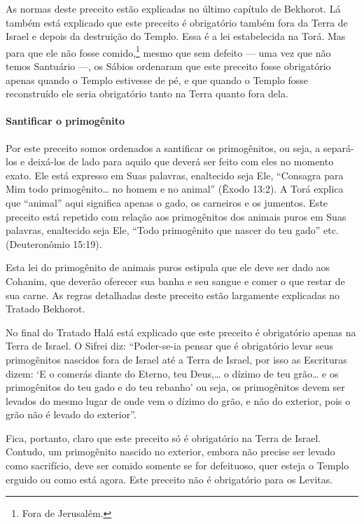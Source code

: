 As normas deste preceito estão explicadas no último capítulo de Bekhorot. Lá também está explicado que este preceito é obrigatório também
fora da Terra de Israel e depois da destruição do Templo. Essa é a lei
estabelecida na Torá. Mas para que ele não fosse comido,\footnote{Fora de Jerusalém.} mesmo
que sem defeito ---
uma vez que não temos Santuário ---, os Sábios ordenaram que este
preceito fosse obrigatório apenas quando o Templo estivesse de pé, e que quando o
Templo fosse reconstruído ele seria obrigatório tanto na Terra quanto
fora dela.

\paragraph{Santificar o primogênito}

Por este preceito somos ordenados a santificar os primogênitos, ou seja,
a separá-los e deixá-los de lado para aquilo que deverá ser feito com
eles no momento exato. Ele está expresso em Suas palavras, enaltecido
seja Ele, ``Consagra para Mim todo primogênito\ldots{} no homem e no
animal'' (Êxodo 13:2). A Torá explica que ``animal'' aqui significa
apenas o gado, os carneiros e os jumentos. Este preceito está repetido
com relação aos primogênitos dos animais puros em Suas palavras,
enaltecido seja Ele, ``Todo primogênito que nascer do teu gado'' etc.
(Deuteronômio 15:19).

Esta lei do primogênito de animais puros estipula que ele deve ser dado
aos Cohanim, que deverão oferecer sua banha e seu sangue e comer
o que restar de sua carne. As regras detalhadas deste preceito estão
largamente explicadas no Tratado Bekhorot.

No final do Tratado Halá está explicado que este preceito é obrigatório
apenas na Terra de Israel. O Sifrei diz: ``Poder-se-ia pensar que é
obrigatório levar seus primogênitos nascidos fora de Israel até a Terra
de Israel, por isso as Escrituras dizem: `E o comerás diante do Eterno,
teu Deus,\ldots{} o dízimo de teu grão\ldots{} e os primogênitos do teu gado e do %
teu rebanho' ou seja, os primogênitos devem ser levados do mesmo lugar
de onde vem o dízimo do grão, e não do exterior, pois o grão não é
levado do exterior''.

Fica, portanto, claro que este preceito só é obrigatório na Terra de
Israel. Contudo, um primogênito nascido no exterior, embora não precise
ser levado como sacrifício, deve ser comido somente se for defeituoso,
quer esteja o Templo erguido ou como está agora. Este preceito não é
obrigatório para os Levitas.

